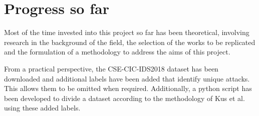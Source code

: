 \chapter{Progress so far}%
\label{chp:progress}

Most of the time invested into this project so far has been theoretical,
involving research in the background of the field, the selection of the works
to be replicated and the formulation of a methodology to address the aims of
this project.

From a practical perspective, the CSE-CIC-IDS2018 dataset has been downloaded
and additional labels have been added that identify unique attacks. This allows
them to be omitted when required. Additionally, a python script has been
developed to divide a dataset according to the methodology of Kus et al.~\cite{Kus} using
these added labels.